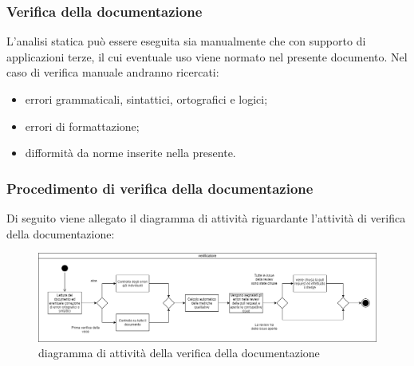 	\subsubsection{Verifica della documentazione}
	L'analisi statica può essere eseguita sia manualmente che con supporto di applicazioni terze, il cui eventuale uso viene normato nel presente documento. Nel caso di verifica manuale andranno ricercati:
	\begin{itemize}
	    \item errori grammaticali, sintattici, ortografici e logici;
	    \item errori di formattazione;
	    \item difformità da norme inserite nella presente.
	\end{itemize}
		
		\subsubsection{Procedimento di verifica della documentazione}
		Di seguito viene allegato il diagramma di attività riguardante l'attività di verifica della documentazione:
		\begin{figure}[hbt!]
	       \centering \includegraphics[width=1.0\textwidth]{../_template/images/verifica.png}
	        \caption{diagramma di attività della verifica della documentazione}
	    \end{figure}
	
